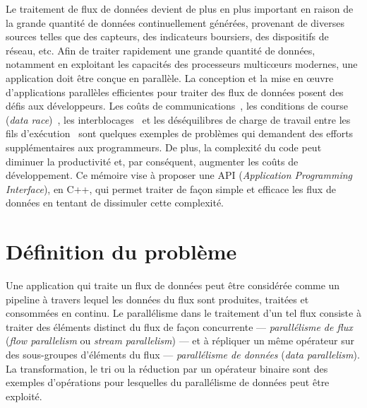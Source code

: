 \begin{introduction}

Le traitement de flux de donn\'ees devient de plus en plus important en raison de la grande quantit\'e de donn\'ees continuellement g\'en\'er\'ees, provenant de diverses sources telles que des capteurs, des indicateurs boursiers, des dispositifs de r\'eseau, etc. Afin de traiter rapidement une grande quantit\'e de donn\'ees, notamment en exploitant les capacit\'es des processeurs multicœurs modernes, une application doit \^etre con\c cue en parall\`ele. La conception et la mise en œuvre d'applications parall\`eles efficientes pour traiter des flux de donn\'ees posent des d\'efis aux d\'eveloppeurs. Les co\^uts de communications~\citep{amarasinghe2011ascr}, les conditions de course (\emph{data race})~\citep{wu2015detecting}, les interblocages~\citep{haque2006concurrent} et les d\'es\'equilibres de charge de travail entre les fils d'ex\'ecution~\citep{amarasinghe2011ascr} sont quelques exemples de probl\`emes qui demandent des efforts suppl\'ementaires aux programmeurs. De plus, la complexit\'e du code peut diminuer la productivit\'e et, par cons\'equent, augmenter les co\^uts de d\'eveloppement. Ce m\'emoire vise \`a proposer une API (\emph{Application Programming Interface}), en C++, qui permet traiter de fa\c con simple et efficace les flux de donn\'ees en tentant de dissimuler cette complexit\'e.

\section*{D\'efinition du probl\`eme}

Une application qui traite un flux de données peut \^etre consid\'er\'ee comme un pipeline \`a travers lequel les donn\'ees du flux sont produites, trait\'ees et consomm\'ees en continu. Le parall\'elisme dans le traitement d'un tel flux consiste \`a traiter des \'el\'ements distinct du flux de fa\c{c}on concurrente --- \emph{parall\'elisme de flux} (\emph{flow parallelism} ou \emph{stream parallelism}) --- et \`a r\'epliquer un m\^eme op\'erateur sur des sous-groupes d'\'el\'ements du flux --- \emph{parall\'elisme de donn\'ees} (\emph{data parallelism}). La transformation, le tri ou la r\'eduction par un op\'erateur binaire sont des exemples d'op\'erations pour lesquelles du parall\'elisme de donn\'ees peut \^etre exploit\'e. 



\end{introduction}
